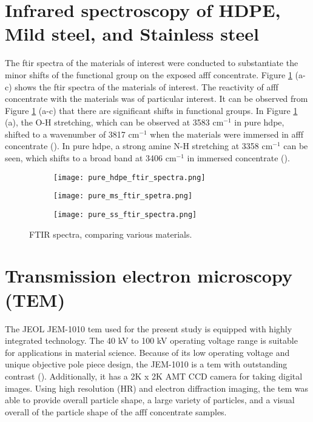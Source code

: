 \section{Infrared spectroscopy of HDPE, Mild steel, and Stainless steel}  
\label{ch5:anchor:section:spectroscopy}

The \acrshort{ftir} spectra of the materials of interest were conducted to substantiate the minor shifts of the functional group on the exposed \acrshort{afff} concentrate. Figure \ref{ch5:figure:materials} (a-c) shows the \acrshort{ftir} spectra of the materials of interest. The reactivity of \acrshort{afff} concentrate with the materials was of particular interest. It can be observed from Figure \ref{ch5:figure:materials} (a-c) that there are significant shifts in functional groups. In Figure \ref{ch5:figure:materials} (a), the O-H stretching, which can be observed at 3583 cm$^{-1}$ in pure \acrshort{hdpe}, shifted to a wavenumber of 3817 cm$^{-1}$ when the materials were immersed in \acrshort{afff} concentrate (\cite{mudunkotuwa2014atr}). In pure \acrshort{hdpe}, a strong amine N-H stretching at 3358 cm$^{-1}$ can be seen, which shifts to a broad band at 3406 cm$^{-1}$ in immersed concentrate (\cite{mohamed2017fourier}).

\begin{figure}[H]
\centering

\begin{subfigure}{.45\textwidth}
    \texttt{[image: pure\_hdpe\_ftir\_spectra.png]}
    \caption{}
\end{subfigure}
\begin{subfigure}{.45\textwidth}
    \texttt{[image: pure\_ms\_ftir\_spetra.png]}
    \caption{}
\end{subfigure}
\begin{subfigure}{.45\textwidth}
    \texttt{[image: pure\_ss\_ftir\_spectra.png]}
    \caption{}
\end{subfigure}

\caption{FTIR spectra, comparing various materials.}
\label{ch5:figure:materials}
\end{figure}

\section{Transmission electron microscopy (TEM)}
The JEOL JEM-1010 \acrshort{tem} used for the present study is equipped with highly integrated technology. The 40 kV to 100 kV operating voltage range is suitable for applications in material science. Because of its low operating voltage and unique objective pole piece design, the JEM-1010 is a \acrshort{tem} with outstanding contrast (\cite{klein2011transmission}). Additionally, it has a 2K x 2K AMT CCD camera for taking digital images. Using high resolution (HR) and electron diffraction imaging, the \acrshort{tem} was able to provide overall particle shape, a large variety of particles, and a visual overall of the particle shape of the \acrshort{afff} concentrate samples. 

